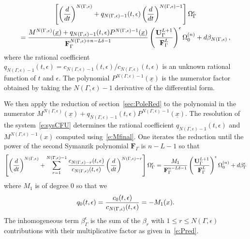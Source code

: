 \documentclass[a4paper,12pt]{article}
\numberwithin{equation}{section}
\numberwithin{figure}{section}
\begin{document}
\begin{multline}\label{e:step2}
\left[\left(d\over dt\right)^{N(\Gamma,\epsilon)}
  +q_{N(\Gamma,\epsilon)-1}(t,\epsilon) \left(d\over dt\right)^{N(\Gamma,\epsilon)-1}\right] \Omega_\Gamma^\epsilon\cr= {M^{
      N(\Gamma,\epsilon)}(\underline x)+q_{N(\Gamma,\epsilon)-1}(t,\epsilon)
    P^{N(\Gamma,\epsilon)-1}(\underline x) \over
    \textbf{F}_\Gamma^{N(\Gamma,\epsilon)+n-L\delta-1}
  }\left(\textbf{U}_\Gamma^{L+1}\over \textbf{F}_\Gamma^L
  \right)^\epsilon \Omega_0^{(n)}+ d\beta_{N(\Gamma,\epsilon)}\, ,  
\end{multline}
where the rational coefficient
$q_{N(\Gamma,\epsilon)-1}(t,\epsilon)=c_{N(\Gamma,\epsilon)-1}(t,\epsilon)/c_{N(\Gamma,\epsilon)}(t,\epsilon)$
is an unknown rational function of $t$ and $\epsilon$. 
The polynomial $ P^{N(\Gamma,\epsilon)-1}(\underline x) $
is the numerator factor obtained by taking the $N(\Gamma,\epsilon)-1$
derivative of the differential form.

We then apply the reduction of section~\ref{sec:PoleRed} to
the polynomial in the numerator
$M^{
      N(\Gamma,\epsilon)}(\underline x)+q_{N(\Gamma,\epsilon)-1}(t,\epsilon)
    P^{N(\Gamma,\epsilon)-1}(\underline x)$.
The resolution of the
system~\eqref{e:sysCFU} determines the  rational coefficient
$q_{N(\Gamma,\epsilon)-1}(t,\epsilon)$ and
$M^{N(\Gamma,\epsilon)-1}(x)$ computed using~\eqref{e:Mfinal}. One
iterates the reduction until the power of  the second Symanzik
polynomial $\textbf{F}_\Gamma$ is $n-L-1$ so
that
\begin{equation}\label{e:stepfinal}
\left[\left(d\over dt\right)^{N(\Gamma,\epsilon)}
  +\sum_{r=1}^{N(\Gamma,\epsilon)-1}
  {c_{N(\Gamma,\epsilon)-r}(t,\epsilon)\over c_{N(\Gamma,\epsilon)}(t,\epsilon)} \left(d\over dt\right)^{N(\Gamma,\epsilon)-r}\right] \Omega_\Gamma^\epsilon= {M_{1}\over
    \textbf{F}_\Gamma^{n-L\delta-1}
  }\left(\textbf{U}_\Gamma^{L+1}\over \textbf{F}_\Gamma^L
  \right)^\epsilon \Omega_0^{(n)}+ d\beta_\Gamma^\epsilon 
\end{equation}
where $M_1$ is of degree 0 so that we
\begin{equation}
  q_0(t,\epsilon)=  {c_{0}(t,\epsilon)\over c_{N(\Gamma,\epsilon)}(t,\epsilon)}= -M_1(x)  .
\end{equation}
The inhomogeneous term  $\beta_\Gamma^\epsilon $ is the sum of the
$\beta_r$ with $1\leq
r\leq N(\Gamma,\epsilon)$
contributions with their multiplicative factor as given in~\eqref{e:Pred}.

\medskip
 
\end{document}
